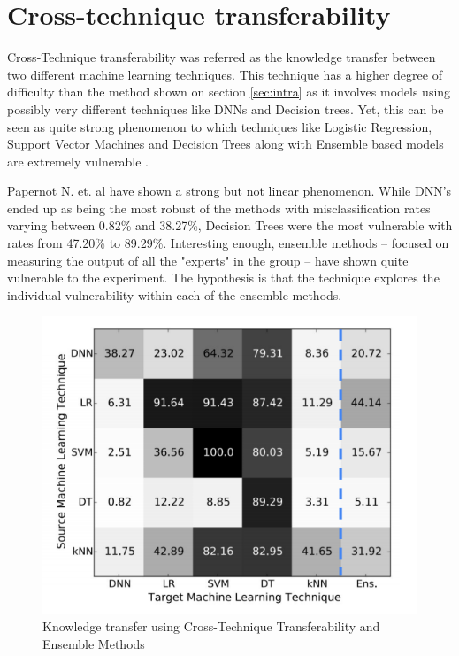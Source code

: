 \section{Cross-technique transferability}
Cross-Technique transferability was referred as the knowledge transfer between two different machine learning techniques. This technique has a higher degree of difficulty than the method shown on section \ref{sec:intra} as it involves models using possibly very different techniques like DNNs and Decision trees. Yet, this can be seen as quite strong phenomenon to which techniques like Logistic Regression, Support Vector Machines and Decision Trees along with Ensemble based models are extremely vulnerable \cite{papernot2016transf}.

Papernot N. et. al \cite{papernot2016transf} have shown a strong but not linear phenomenon. While DNN's ended up as being the most robust of the methods with misclassification rates varying between 0.82\% and 38.27\%, Decision Trees were the most vulnerable with rates from 47.20\% to 89.29\%. Interesting enough, ensemble methods -- focused on measuring the output of all the "experts" in the group -- have shown quite vulnerable to the experiment. The hypothesis is that the technique explores the individual vulnerability within each of the ensemble methods.

\begin{figure}[!h]
\centering
	\includegraphics[scale=0.6]{cross.png}
\caption{Knowledge transfer using Cross-Technique Transferability and Ensemble Methods \cite{papernot2016transf}}
\label{fig:cross}
\end{figure}
